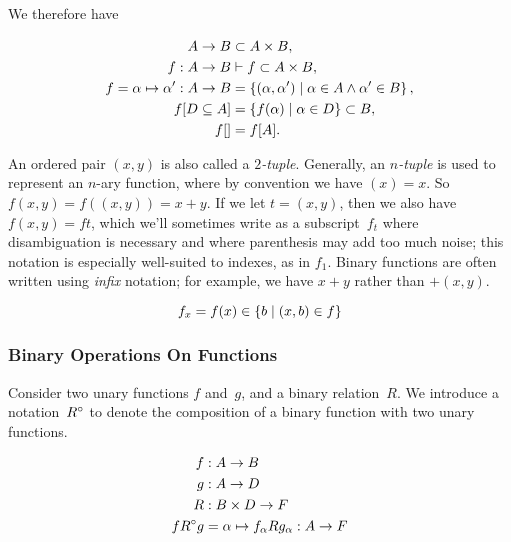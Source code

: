 We therefore have

\begin{align}
  A \rightarrow B &\subset A\times B, \\
  f : A \rightarrow B &\vdash f \subset A\times B, \\
  f = \alpha \mapsto \alpha' : A \rightarrow B
                  &= \left\{(\alpha,\alpha')
                            \mid \alpha\in A \land \alpha'\in B\right\}, \\
  f[D\subseteq A] &= \left\{f(\alpha) \mid \alpha\in D\right\} \subset B, \\
  f[] &= f[A].
\end{align}

An ordered pair $(x,y)$ is also called a \emph{$2$-tuple}.
Generally,
  an \emph{$n$-tuple} is used to represent an $n$-ary function,
    where by convention we have $(x)=x$.
So $f(x,y) = f((x,y)) = x+y$.
If we let $t=(x,y)$,
  then we also have $f(x,y) = ft$,
    which we'll sometimes write as a subscript~$f_t$ where disambiguation is
      necessary and where parenthesis may add too much noise;
        this notation is especially well-suited to indexes,
          as in $f_1$.
Binary functions are often written using \emph{infix} notation;
  for example, we have $x+y$ rather than $+(x,y)$.

\begin{equation}
  f_x = f(x) \in \left\{b \mid (x,b) \in f\right\}
\end{equation}


\subsubsection{Binary Operations On Functions}
Consider two unary functions $f$ and~$g$,
  and a binary relation~$R$.
We introduce a notation~${R}^\circ$ to denote the composition of a binary
  function with two unary functions.

\begin{align}
  f &: A \rightarrow B \\
  g &: A \rightarrow D \\
  R &: B\times D \rightarrow F \\
  f {R}^\circ g &= \alpha \mapsto f_\alpha R g_\alpha : A \rightarrow F
\end{align}

